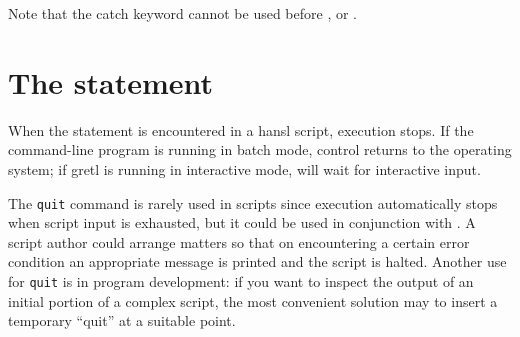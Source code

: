 
Note that the catch keyword cannot be used before , 
or . 

\section{The  statement}

When the  statement is encountered in a hansl script,
execution stops. If the command-line program  is running
in batch mode, control returns to the operating system; if gretl is
running in interactive mode,  will wait for interactive
input. 

The \texttt{quit} command is rarely used in scripts since execution
automatically stops when script input is exhausted, but it could be
used in conjunction with . A script author could arrange
matters so that on encountering a certain error condition an
appropriate message is printed and the script is halted. Another use
for \texttt{quit} is in program development: if you want to inspect the
output of an initial portion of a complex script, the most convenient
solution may to insert a temporary ``quit'' at a suitable point.

